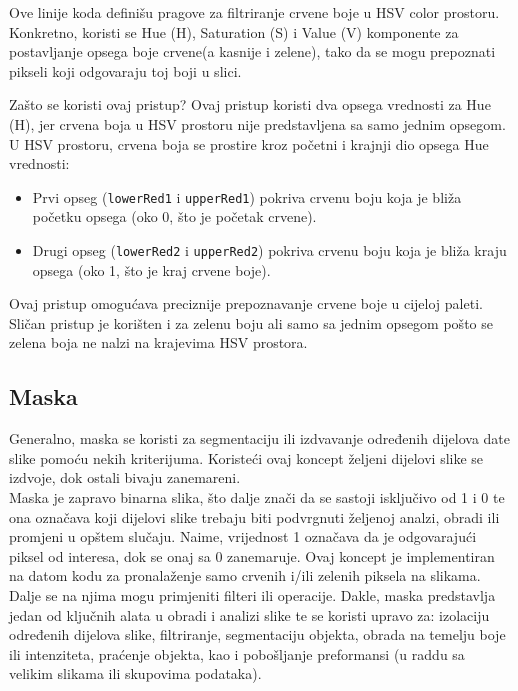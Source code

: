 \documentclass[a4paper,12pt]{article}
\begin{document}


Ove linije koda definišu pragove za filtriranje crvene boje u HSV color prostoru. 
Konkretno, koristi se Hue (H), Saturation (S) i Value (V) komponente za postavljanje opsega boje crvene(a kasnije i zelene), tako da se mogu prepoznati pikseli koji odgovaraju toj boji u slici.

Zašto se koristi ovaj pristup?
Ovaj pristup koristi dva opsega vrednosti za Hue (H), jer crvena boja u HSV prostoru nije predstavljena sa samo jednim opsegom. 
U HSV prostoru, crvena boja se prostire kroz početni i krajnji dio opsega Hue vrednosti:

\begin{itemize}
    \item Prvi opseg (\texttt{lowerRed1} i \texttt{upperRed1}) pokriva crvenu boju koja je bliža početku opsega (oko 0, što je početak crvene).
    \item Drugi opseg (\texttt{lowerRed2} i \texttt{upperRed2}) pokriva crvenu boju koja je bliža kraju opsega (oko 1, što je kraj crvene boje).
\end{itemize}
Ovaj pristup omogućava preciznije prepoznavanje crvene boje u cijeloj paleti. 
Sličan pristup je korišten i za zelenu boju ali samo sa jednim opsegom pošto se zelena boja ne nalzi na krajevima HSV prostora.



\subsection{Maska}
Generalno, maska se koristi za segmentaciju ili izdvavanje određenih dijelova date slike pomoću nekih kriterijuma.
Koristeći ovaj koncept željeni dijelovi slike se izdvoje, dok ostali bivaju zanemareni. \\

Maska je zapravo binarna slika, što dalje znači da se sastoji isključivo od 1 i 0 te ona označava koji dijelovi slike trebaju biti podvrgnuti željenoj analzi, obradi ili promjeni u opštem slučaju. 
Naime, vrijednost 1 označava da je odgovarajući piksel od interesa, dok se onaj sa 0 zanemaruje. 
Ovaj koncept je implementiran na datom kodu za pronalaženje samo crvenih i/ili zelenih piksela na slikama. \\

Dalje se na njima mogu primjeniti filteri ili operacije. 
Dakle, maska predstavlja jedan od ključnih alata u obradi i analizi slike te se koristi upravo za: izolaciju određenih dijelova slike, filtriranje, segmentaciju objekta, obrada na temelju boje ili intenziteta, praćenje objekta, kao i pobošljanje preformansi (u raddu sa velikim slikama ili skupovima podataka).\\
\end{document}
